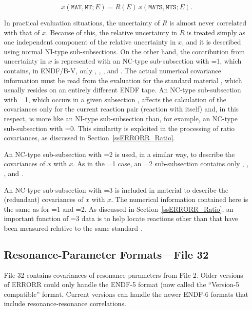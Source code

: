 \begin{equation}
x({\mathtt{MAT,MT}};E) = R(E)\, x ({\mathtt{MATS,MTS}};E).
\label{e18}
\end{equation}

In practical evaluation situations, the uncertainty of $R$ is almost
never correlated with that of $x$.  Because of this,
the relative uncertainty in $R$ is treated simply as one independent
component of the relative uncertainty in $x$, and it is
described using normal NI-type sub-subsections.  On the other hand, the
contribution from uncertainty in $x$ is represented
with an NC-type sub-subsection with =1, which contains,
in ENDF/B-V, only , , , and .
The actual numerical covariance information must be read from the
evaluation for the standard material , which usually resides
on an entirely different ENDF tape.  An NC-type sub-subsection with
=1, which occurs in a given subsection
, affects the calculation of the covariances
only for the current reaction pair (reaction  with itself)
and, in this respect, is more like an NI-type sub-subsection than, for
example, an NC-type sub-subsection with =0.  This similarity
is exploited in the processing of ratio covariances, as discussed in
Section~\ref{ssERRORR_Ratio}.

An NC-type sub-subsection with =2 is used, in a similar way,
to describe the covariances of $x$ with
$x$.  As in the =1 case, an =2
sub-subsection contains only , , , and
.

An NC-type sub-subsection with =3 is included in material
 to describe the (redundant) covariances of
$x$ with $x$.  The numerical
information contained here is the same as for =1 and
=2.  As discussed in Section~\ref{ssERRORR_Ratio},
an important function of
=3 data is to help locate reactions other than
 that have been measured relative to the same standard
.


\subsection{Resonance-Parameter Formats---File 32}
\label{ssERRORR_RR32}

File 32 contains covariances of resonance parameters
 from File 2.  Older versions of ERRORR
could only handle the ENDF-5 format (now called the
``Version-5 compatible'' format.  Current versions can handle the
newer ENDF-6 formats that include resonance-resonance correlations.

